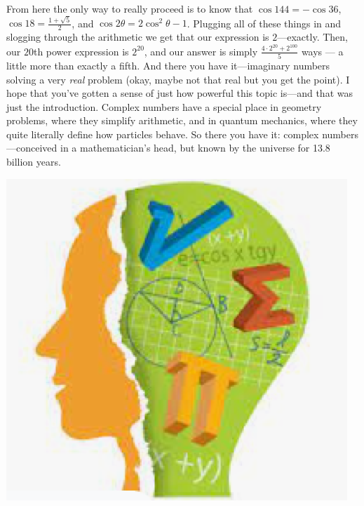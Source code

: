 \documentclass{article}
\begin{document}
From here the only way to really proceed is to know that $\cos 144=-\cos 36$, $\cos 18=\frac{1+\sqrt5}{2}$, and $\cos 2\theta=2\cos^2 \theta -1$. Plugging all of these things in and slogging through the arithmetic we get that our expression is $2$—exactly. Then, our $20$th power expression is $2^20$, and our answer is simply $\frac{4\cdot 2^{20}+2^{100}}{5}$ ways — a little more than exactly a fifth. 
And there you have it—imaginary numbers solving a very \emph{real} problem (okay, maybe not that real but you get the point). I hope that you’ve gotten a sense of just how powerful this topic is—and that was just the introduction. Complex numbers have a special place in geometry problems, where they simplify arithmetic, and in quantum mechanics, where they quite literally define how particles behave. So there you have it: complex numbers—conceived in a mathematician's head, but known by the universe for 13.8 billion years. 
\begin{center}
    \includegraphics[scale=0.7]{images/root2.png}
\end{center}
\end{document}
